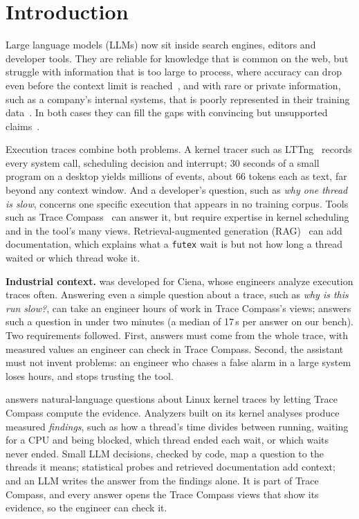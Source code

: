 \section{Introduction}
\label{sec:intro}

Large language models (LLMs) now sit inside search engines, editors and developer tools. They are reliable for knowledge that is common on the web, but struggle with information that is too large to process, where accuracy can drop even before the context limit is reached~\cite{liu2024lost}, and with rare or private information, such as a company's internal systems, that is poorly represented in their training data~\cite{kandpal2023longtail}. In both cases they can fill the gaps with convincing but unsupported claims~\cite{ji2023hallucination}.

Execution traces combine both problems. A kernel tracer such as LTTng~\cite{desnoyers2006lttng} records every system call, scheduling decision and interrupt; 30 seconds of a small program on a desktop yields millions of events, about 66 tokens each as text, far beyond any context window. And a developer's question, such as \emph{why one thread is slow}, concerns one specific execution that appears in no training corpus. Tools such as Trace Compass~\cite{tracecompass} can answer it, but require expertise in kernel scheduling and in the tool's many views. Retrieval-augmented generation (RAG)~\cite{lewis2020rag} can add documentation, which explains what a \texttt{futex} wait is but not how long a thread waited or which thread woke it.

\textbf{Industrial context.} \sysname was developed for Ciena, whose engineers analyze execution traces often. Answering even a simple question about a trace, such as \emph{why is this run slow?}, can take an engineer hours of work in Trace Compass's views; \sysname answers such a question in under two minutes (a median of 17\,s per answer on our bench). Two requirements followed. First, answers must come from the whole trace, with measured values an engineer can check in Trace Compass. Second, the assistant must not invent problems: an engineer who chases a false alarm in a large system loses hours, and stops trusting the tool.

\sysname answers natural-language questions about Linux kernel traces by letting Trace Compass compute the evidence. Analyzers built on its kernel analyses produce measured \emph{findings}, such as how a thread's time divides between running, waiting for a CPU and being blocked, which thread ended each wait, or which waits never ended. Small LLM decisions, checked by code, map a question to the threads it means; statistical probes and retrieved documentation add context; and an LLM writes the answer from the findings alone. It is part of Trace Compass, and every answer opens the Trace Compass views that show its evidence, so the engineer can check it.

